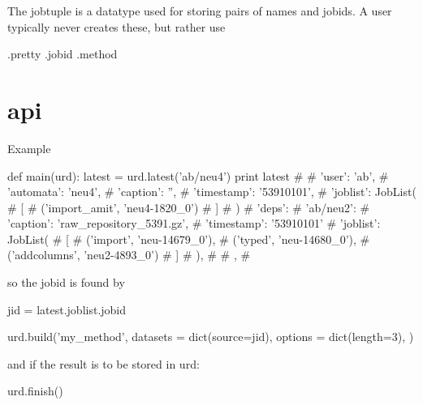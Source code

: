 The jobtuple is a datatype used for storing pairs of names and jobids.
A user typically never creates these, but rather use
\begin{python}

\end{python}


.pretty
.jobid
.method


\section{api}
Example

\begin{python}
def main(urd):
  latest = urd.latest('ab/neu4')
  print latest
#{
#  'user': 'ab',
#  'automata': 'neu4',
#  'caption': '',
#  'timestamp': '53910101',
#  'joblist': JobList(
#    [
#      ('import_amit', 'neu4-1820_0')
#    ]
#  )
#  'deps': {
#    'ab/neu2': {
#      'caption': 'raw_repository_5391.gz',
#      'timestamp': '53910101'
#      'joblist': JobList(
#        [
#          ('import', 'neu-14679_0'),
#          ('typed', 'neu-14680_0'),
#          ('addcolumns', 'neu2-4893_0')
#        ]
#      ),
#    }
#  },
#}
\end{python}
so the jobid is found by

\begin{python}
  jid = latest.joblist.jobid

  urd.build('my_method',
    datasets = dict(source=jid),
    options = dict(length=3),
  )
\end{python}
and if the result is to be stored in urd:

\begin{python}
  urd.finish()
\end{python}

